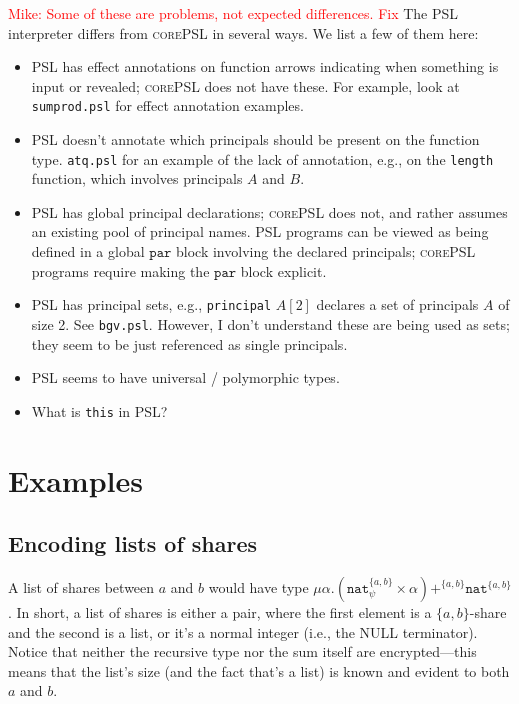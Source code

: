 \documentclass[10pt]{article}
\newcommand{\kw}[1]{\ensuremath{\mathtt{#1}}}
\newcommand{\tnat}{\ensuremath{\mathtt{nat}}}
\newcommand{\tpair}[2]{\ensuremath{{#1} \times {#2}}}
\newcommand{\tsum}[3]{\ensuremath{{#1} +^{#3} {#2}}}
\newcommand{\trec}[2]{\ensuremath{\mu {#1}.{#2}}}
\newcommand{\lang}{\textsc{corePSL}\xspace}
\newcommand{\mwh}[1]{\textcolor{red}{Mike: #1}}
\begin{document}
\mwh{Some of these are problems, not expected differences. Fix}
The PSL interpreter differs from \lang in several ways. We list a few
of them here:
\begin{itemize}
\item PSL has effect annotations on function arrows indicating when
  something is input or revealed; \lang does not have these. For
  example, look at \texttt{sumprod.psl} for effect annotation
  examples.
\item PSL doesn't annotate which principals should be present on the
  function type. \texttt{atq.psl} for an example of the lack
  of annotation, e.g., on the \texttt{length} function, which involves
  principals $A$ and $B$. 
\item PSL has global principal declarations; \lang does not, and
  rather assumes an existing pool of principal names. PSL programs can
  be viewed as being defined in a global $\kw{par}$ block involving
  the declared principals; \lang programs require making the
  $\kw{par}$ block explicit.
\item PSL has principal sets, e.g., \texttt{principal} $A[2]$ declares
  a set of principals $A$ of size 2. See \texttt{bgv.psl}. However, I
  don't understand these are being used as sets; they seem to be just
  referenced as single principals.
\item PSL seems to have universal / polymorphic types.
\item What is \texttt{this} in PSL?
\end{itemize}

\section{Examples}
\label{sec:examples}

\subsection{Encoding lists of shares}

\newcommand{\twoprins}{\ensuremath{\{a,b\}}}

A list of shares between $a$ and $b$ would have type
$\trec{\alpha}{\tsum{(\tpair{\tnat^{\twoprins}_\psi}{\alpha})}{\tnat^{\twoprins}}{\twoprins}}$. In
short, a list of shares is either a pair, where the first element is a
\twoprins-share and the second is a list, or it's a normal integer
(i.e., the NULL terminator). Notice that neither the recursive type
nor the sum itself are encrypted---this means that the list's size
(and the fact that's a list) is known and evident to both $a$ and $b$.
\end{document}
